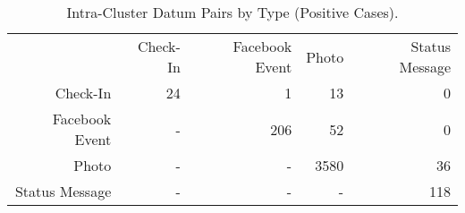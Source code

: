\begin{table}[htp]
	\begin{center}
	\caption{Intra-Cluster Datum Pairs by Type (Positive Cases).}
	\label{tab:ch6_table_intra_xtype_cluster}
		\begin{tabular}{r r r r r }
		\toprule
			 & Check-In & Facebook Event & Photo & Status Message\\
			Check-In & 24 & 1 & 13 & 0\\
			Facebook Event & - & 206 & 52 & 0\\
			Photo & - & - & 3580 & 36\\
			Status Message & - & - & - & 118\\
		\bottomrule
		\end{tabular}
	\end{center}
\end{table}